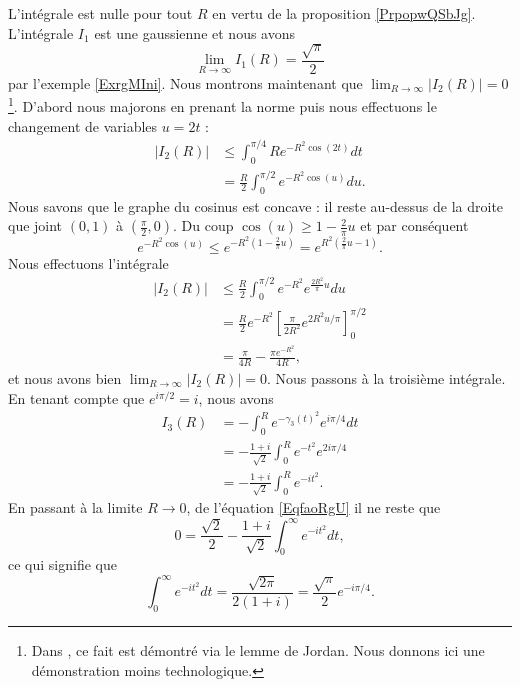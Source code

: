 L'intégrale est nulle pour tout \( R\) en vertu de la proposition \ref{PrpopwQSbJg}. L'intégrale \( I_1\) est une gaussienne et nous avons
\begin{equation}
    \lim_{R\to\infty}I_1(R)=\frac{ \sqrt{\pi} }{ 2 }
\end{equation}
par l'exemple \ref{ExrgMIni}. Nous montrons maintenant que \( \lim_{R\to\infty}| I_2(R) |=0\)\footnote{Dans \cite{FresnelDavidS}, ce fait est démontré via le lemme de Jordan. Nous donnons ici une démonstration moins technologique.}. D'abord nous majorons en prenant la norme puis nous effectuons le changement de variables \( u=2t\) :
\begin{subequations}
    \begin{align}
        | I_2(R) |&\leq \int_{0}^{\pi/4}R e^{-R^2\cos(2t)}dt\\
        &=\frac{ R }{ 2 }\int_0^{\pi/2} e^{-R^2\cos(u)}du.
    \end{align}
\end{subequations}
Nous savons que le graphe du cosinus est concave : il reste au-dessus de la droite que joint \( (0,1)\) à \( (\frac{ \pi }{2},0)\). Du coup \( \cos(u)\geq 1-\frac{ 2 }{ \pi }u\) et par conséquent
\begin{equation}
        e^{-R^2\cos(u)}\leq  e^{-R^2(1-\frac{ 2 }{ \pi }u)}= e^{R^2(\frac{ 2 }{ \pi }u-1)}.
\end{equation}
Nous effectuons l'intégrale
\begin{subequations}
    \begin{align}
        | I_2(R) |&\leq \frac{ R }{2}\int_0^{\pi/2} e^{-R^2} e^{\frac{ 2R^2 }{ \pi }u}du\\
        &=\frac{ R }{2} e^{-R^2}\left[ \frac{ \pi }{ 2R^2 } e^{2R^2 u/\pi} \right]_0^{\pi/2}\\
        &=\frac{ \pi }{ 4R }-\frac{ \pi e^{-R^2} }{ 4R },
    \end{align}
\end{subequations}
et nous avons bien \( \lim_{R\to\infty}| I_2(R) |=0\). Nous passons à la troisième intégrale. En tenant compte que \(  e^{i\pi/2}=i\), nous avons
\begin{subequations}
    \begin{align}
        I_3(R)&=-\int_0^R e^{-\gamma_3(t)^2} e^{i\pi/4}dt\\
        &=-\frac{ 1+i }{ \sqrt{2} }\int_0^R e^{-t^2} e^{2i\pi/4}\\
        &=-\frac{ 1+i }{ \sqrt{2} }\int_0^R e^{-it^2}.
    \end{align}
\end{subequations}
En passant à la limite \( R\to 0 \), de l'équation \eqref{EqfaoRgU} il ne reste que
\begin{equation}
    0=\frac{ \sqrt{2} }{2}-\frac{ 1+i }{ \sqrt{2} }\int_0^{\infty} e^{-it^2}dt,
\end{equation}
ce qui signifie que
\begin{equation}
    \int_0^{\infty} e^{-it^2}dt=\frac{ \sqrt{2\pi} }{ 2(1+i) }=\frac{ \sqrt{\pi} }{2} e^{-i\pi/4}.
\end{equation}

